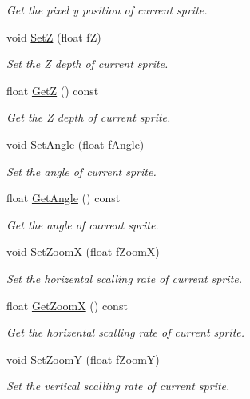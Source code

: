 \begin{DoxyCompactItemize}
\begin{DoxyCompactList}\small\item\em Get the pixel y position of current sprite. \end{DoxyCompactList}\item 
void \hyperlink{class_iris2_d_1_1_iris_sprite_a284d2af8d27d8fb72718e9554e0e90d9}{SetZ} (float fZ)
\begin{DoxyCompactList}\small\item\em Set the Z depth of current sprite. \end{DoxyCompactList}\item 
float \hyperlink{class_iris2_d_1_1_iris_sprite_ad4966003c9bf2ad093db013de626e44c}{GetZ} () const
\begin{DoxyCompactList}\small\item\em Get the Z depth of current sprite. \end{DoxyCompactList}\item 
void \hyperlink{class_iris2_d_1_1_iris_sprite_a3fdbc5131b10eb0cb544df0beee82da2}{Set\+Angle} (float f\+Angle)
\begin{DoxyCompactList}\small\item\em Set the angle of current sprite. \end{DoxyCompactList}\item 
float \hyperlink{class_iris2_d_1_1_iris_sprite_aef46b946bf5f46465ea164debdc78e57}{Get\+Angle} () const
\begin{DoxyCompactList}\small\item\em Get the angle of current sprite. \end{DoxyCompactList}\item 
void \hyperlink{class_iris2_d_1_1_iris_sprite_a0c7c13b0d3ec355a09e3c9c2ccc9d91e}{Set\+ZoomX} (float f\+ZoomX)
\begin{DoxyCompactList}\small\item\em Set the horizental scalling rate of current sprite. \end{DoxyCompactList}\item 
float \hyperlink{class_iris2_d_1_1_iris_sprite_a1cb9fb2549f00ef1efab204f0d222aeb}{Get\+ZoomX} () const
\begin{DoxyCompactList}\small\item\em Get the horizental scalling rate of current sprite. \end{DoxyCompactList}\item 
void \hyperlink{class_iris2_d_1_1_iris_sprite_a316b2fbf2d0ecb1a1cd5b7bb95d62f05}{Set\+ZoomY} (float f\+ZoomY)
\begin{DoxyCompactList}\small\item\em Set the vertical scalling rate of current sprite. \end{DoxyCompactList}\item 

\end{DoxyCompactItemize}
